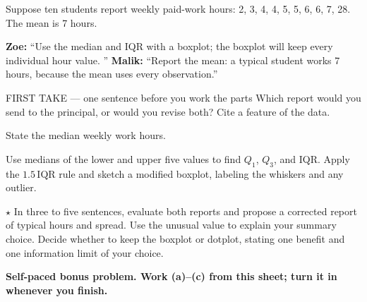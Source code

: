 \documentclass[12pt]{extarticle}
\begin{document}
\pagestyle{empty}


\noindent\begin{minipage}[t]{0.57\linewidth}
\vspace{0pt}
Suppose ten students report weekly paid-work hours: 2, 3, 4, 4, 5, 5, 6, 6, 7, 28. The mean is 7 hours.\par\smallskip \textbf{Zoe:} ``Use the median and IQR with a boxplot; the boxplot will keep every individual hour value. '' \textbf{Malik:} ``Report the mean: a typical student works 7 hours, because the mean uses every observation.''\par
\end{minipage}\hfill
\begin{minipage}[t]{0.40\linewidth}
\vspace{0pt}
\begin{center}
\end{center}
\end{minipage}

\begin{firsttakebox}{FIRST TAKE --- one sentence before you work the parts}
Which report would you send to the principal, or would you revise both? Cite a feature of the data.
\end{firsttakebox}

\begin{description}[leftmargin=1.15in, labelwidth=1in, itemsep=2pt, topsep=2pt]
  \item[\dokbadge{1}~(a)] State the median weekly work hours.
  \item[\dokbadge{2}~(b)] Use medians of the lower and upper five values to find $Q_1$, $Q_3$, and IQR. Apply the $1.5\,\mathrm{IQR}$ rule and sketch a modified boxplot, labeling the whiskers and any outlier.
  \item[\dokbadge{3}~(c)] $\star$ In three to five sentences, evaluate both reports and propose a corrected report of typical hours and spread. Use the unusual value to explain your summary choice. Decide whether to keep the boxplot or dotplot, stating one benefit and one information limit of your choice.
\end{description}

\vfill
\textbf{Self-paced bonus problem. Work (a)--(c) from this sheet; turn it in whenever you finish.}
\end{document}
